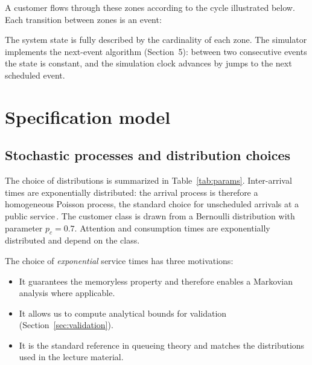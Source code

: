 \documentclass[11pt,a4paper]{article}
\begin{document}
A customer flows through these zones according to the cycle illustrated
below. Each transition between zones is an event:

\begin{center}
\end{center}

The system state is fully described by the cardinality of each zone.
The simulator implements the next-event algorithm (Section~5):
between two consecutive events the state is constant, and the
simulation clock advances by jumps to the next scheduled event.

\section{Specification model}

\subsection{Stochastic processes and distribution choices}
The choice of distributions is summarized in
Table~\ref{tab:params}. Inter-arrival times are exponentially
distributed: the arrival process is therefore a homogeneous Poisson
process, the standard choice for unscheduled arrivals at a public
service\,\cite{harchol_balter}. The customer class is drawn from a
Bernoulli distribution with parameter $p_c = 0.7$. Attention and
consumption times are exponentially distributed and depend on the
class.

The choice of \emph{exponential} service times has three motivations:
\begin{itemize}
\item It guarantees the memoryless property and therefore enables a
Markovian analysis where applicable.
\item It allows us to compute analytical bounds for validation
(Section~\ref{sec:validation}).
\item It is the standard reference in queueing theory and matches the
distributions used in the lecture material.
\end{itemize}
\end{document}
